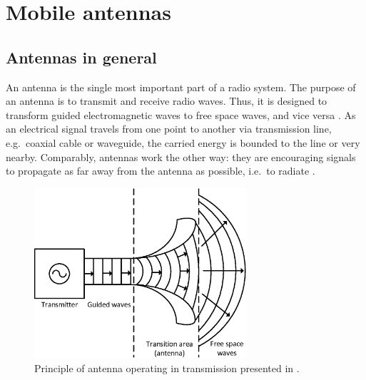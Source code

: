 \section{Mobile antennas}
\label{sec:mobile_antennas}

\subsection{Antennas in general}
\label{sec:general_antennas}
An antenna is the single most important part of a radio system. The purpose of an antenna is to transmit and receive radio waves. Thus, it is designed to transform guided electromagnetic waves to free space waves, and vice versa \cite{holopainen_phd}. As an electrical signal travels from one point to another via transmission line, e.g.\ coaxial cable or waveguide, the carried energy is bounded to the line or very nearby. Comparably, antennas work the other way: they are encouraging signals to propagate as far away from the antenna as possible, i.e.\ to radiate \cite{stutzman}.

\begin{figure}[H]
    \centering
    \includegraphics[width=0.7\textwidth]{img/antenna_principle.eps}
    \caption{Principle of antenna operating in transmission presented in \cite{saunders}.}
    \label{fig:antenna_principle}
\end{figure}

